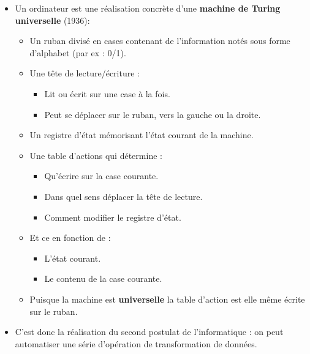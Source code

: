 \begin{slide}
	\begin{itemize}
		\item Un ordinateur est une réalisation concrète d'une \textbf{machine de Turing universelle} (1936):
			\begin{itemize}
				\item Un ruban divisé en cases contenant de l'information notés sous forme d'alphabet (par ex : 0/1).
				\item Une tête de lecture/écriture :
					\begin{itemize}
						\item Lit ou écrit sur une case à la fois.
						\item Peut se déplacer sur le ruban, vers la gauche ou la droite.
					\end{itemize}
				\item Un registre d'état mémorisant l'état courant de la machine.
				\item Une table d'actions qui détermine :
					\begin{itemize}
						\item Qu'écrire sur la case courante.
						\item Dans quel sens déplacer la tête de lecture.
						\item Comment modifier le registre d'état.
					\end{itemize}
				\item	Et ce en fonction de :
					\begin{itemize}
						\item L'état courant.
						\item Le contenu de la case courante.
					\end{itemize}
				\item Puisque la machine est \textbf{universelle} la table d'action est elle même écrite sur le ruban.
			\end{itemize}
	
		\item C'est donc la réalisation du second postulat de l'informatique : on peut automatiser une série d'opération de transformation de données.
	\end{itemize}
\end{slide}

